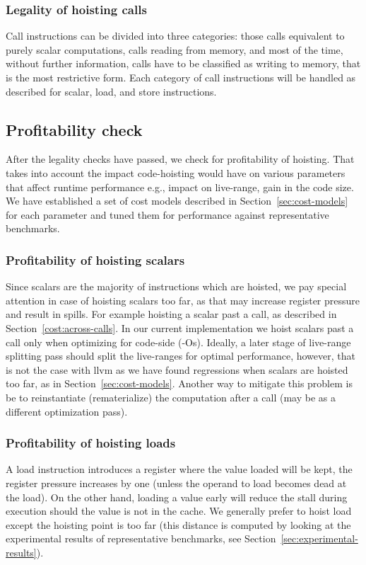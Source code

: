 \documentclass{sig-alternate}
\begin{document}
\subsubsection{Legality of hoisting calls}
Call instructions can be divided into three categories: those calls equivalent
to purely scalar computations, calls reading from memory, and most of the time,
without further information, calls have to be classified as writing to memory,
that is the most restrictive form.  Each category of call instructions will be
handled as described for scalar, load, and store instructions.

\subsection{Profitability check}
\label{subsec:profitability}
After the legality checks have passed, we check for profitability of hoisting.
That takes into account the impact code-hoisting would have on various
parameters that affect runtime performance e.g., impact on live-range, gain in
the code size.  We have established a set of cost models described in Section~\ref{sec:cost-models}
for each parameter and tuned them for performance against representative
benchmarks.

\subsubsection{Profitability of hoisting scalars}
Since scalars are the majority of instructions which are hoisted, we pay special
attention in case of hoisting scalars too far, as that may increase register
pressure and result in spills. For example hoisting a scalar past a call, as
described in Section~\ref{cost:across-calls}.  In our current implementation we
hoist scalars past a call only when optimizing for code-side (-Os). Ideally, a
later stage of live-range splitting pass should split the live-ranges for
optimal performance, however, that is not the case with llvm as we have found
regressions when scalars are hoisted too far, as in
Section~\ref{sec:cost-models}. Another way to mitigate this problem is be to
reinstantiate (rematerialize) the computation after a call (may be as a
different optimization pass).

\subsubsection{Profitability of hoisting loads}
A load instruction introduces a register where the value loaded will be kept,
the register pressure increases by one (unless the operand to load becomes dead
at the load). On the other hand, loading a value early will reduce the stall
during execution should the value is not in the cache. We generally prefer to
hoist load except the hoisting point is too far (this distance is computed by
looking at the experimental results of representative benchmarks, see
Section~\ref{sec:experimental-results}).
\end{document}

